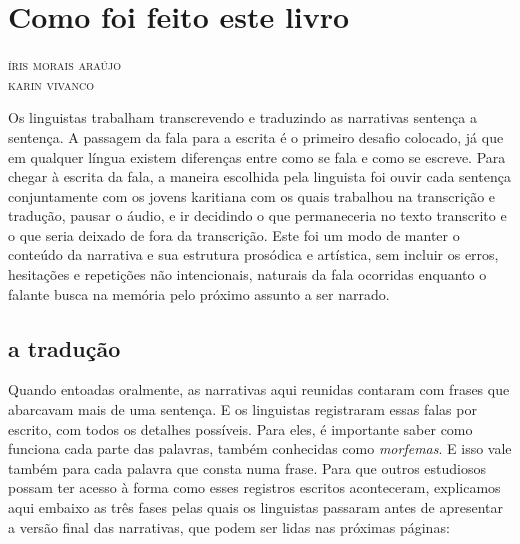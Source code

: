 \chapter{Como foi feito este livro}

\begin{flushright}
\textsc{íris morais araújo}\\
\textsc{karin vivanco}
\end{flushright}

\noindent{}

Os linguistas trabalham transcrevendo e traduzindo as narrativas sentença a sentença. A passagem da fala para a escrita é o primeiro desafio colocado, já que em qualquer língua existem diferenças entre como se fala e como se escreve. Para chegar à escrita da fala, a maneira escolhida pela linguista foi ouvir cada sentença conjuntamente com os jovens karitiana com os quais trabalhou na transcrição e tradução, pausar o áudio, e ir decidindo o que permaneceria no texto transcrito e o que seria deixado de fora da transcrição. Este foi um modo de manter o conteúdo da narrativa e sua estrutura prosódica e artística, sem incluir os erros, hesitações e repetições não intencionais, naturais da fala ocorridas enquanto o falante busca na memória pelo próximo assunto a ser narrado.

\section{a tradução}

Quando entoadas oralmente, as narrativas aqui reunidas contaram com frases que abarcavam mais de uma sentença. E os linguistas registraram essas falas por escrito, com todos os detalhes possíveis. Para eles, é importante saber como funciona cada parte das palavras, também conhecidas como \textit{morfemas}. E isso vale também para cada palavra que consta numa frase. Para que outros estudiosos possam ter acesso à forma como esses registros escritos aconteceram, explicamos aqui embaixo as três fases pelas quais os linguistas passaram antes de apresentar a versão final das narrativas, que podem ser lidas nas próximas páginas:

